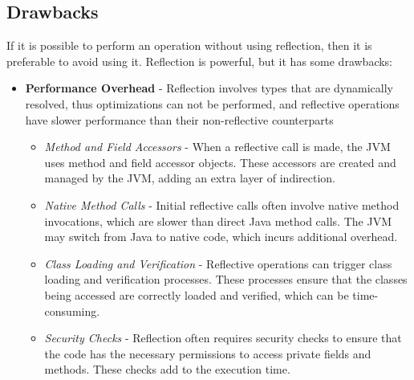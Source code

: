 \subsection{Drawbacks}
\label{sec:reflection_drawbacks}
If it is possible to perform an operation without using reflection, then it is
preferable to avoid using it. Reflection is powerful, but it has some drawbacks:
\begin{itemize}
    \item \textbf{Performance Overhead} - Reflection involves types that are dynamically resolved, thus optimizations
    can not be performed, and reflective operations have slower performance
    than their non-reflective counterparts
    \begin{itemize}
    	\item \textit{Method and Field Accessors} - When a reflective call is made, the JVM uses method and field accessor objects. These accessors are created and managed by the JVM, adding an extra layer of indirection.
    	\item \textit{Native Method Calls} - Initial reflective calls often involve native method invocations, which are slower than direct Java method calls. The JVM may switch from Java to native code, which incurs additional overhead.
    	\item \textit{Class Loading and Verification} - Reflective operations can trigger class loading and verification processes. These processes ensure that the classes being accessed are correctly loaded and verified, which can be time-consuming.
    	\item \textit{Security Checks} - Reflection often requires security checks to ensure that the code has the necessary permissions to access private fields and methods. These checks add to the execution time.
    \end{itemize}
    \nl
    
\end{itemize}
